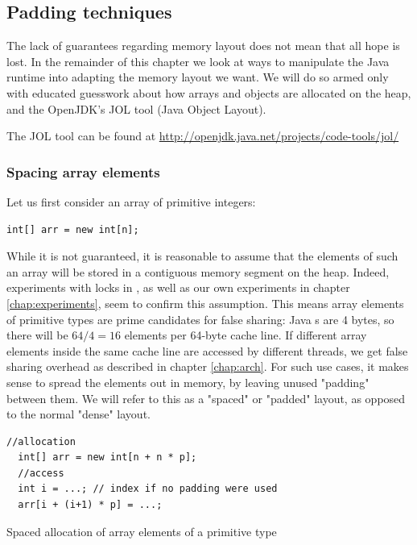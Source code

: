 \subsection{Padding techniques}
The lack of guarantees regarding memory layout does not mean that all hope is
lost. In the remainder of this chapter we look at ways to manipulate the Java
runtime into adapting the memory layout we want. We will do so armed only with
educated guesswork about how arrays and objects are allocated on the heap, and
the OpenJDK's JOL tool (Java Object Layout).

The JOL tool can be found at
\url{http://openjdk.java.net/projects/code-tools/jol/}

\subsubsection{Spacing array elements}

Let us first consider an array of primitive integers:

\begin{code}[h]
\begin{Verbatim}[frame=single]
  int[] arr = new int[n];
\end{Verbatim}
	\caption{}
\end{code}

While it is not guaranteed, it is reasonable to assume that the elements of such
an array will be stored in a contiguous memory segment on the heap. Indeed,
experiments with locks in \cite{mystery}, as well as our own experiments in
chapter \ref{chap:experiments}, seem to confirm this assumption. This means
array elements of primitive types are prime candidates for false sharing:
Java s are 4 bytes, so there will be $64/4 = 16$ elements per
64-byte cache line. If different array elements inside the same cache line are
accessed by different threads, we get false sharing overhead as described in
chapter \ref{chap:arch}. For such use cases, it makes sense to spread the
elements out in memory, by leaving unused "padding" between them. We will refer
to this as a "spaced" or "padded" layout, as opposed to the normal "dense"
layout.

\begin{padding}[h]
\begin{Verbatim}[frame=single]
  //allocation
  int[] arr = new int[n + n * p];
  //access
  int i = ...; // index if no padding were used
  arr[i + (i+1) * p] = ...;
\end{Verbatim}
	\caption{Spaced allocation of array elements of a primitive type}
	\label{padding:primitive-array}
\end{padding}

